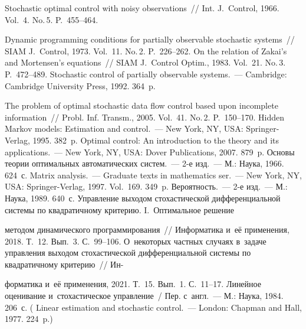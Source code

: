 \begin{multicols}{2}
{{\begin{thebibliography}{99}
 Stochastic optimal control with noisy observations~// Int. J.~Control, 
1966. Vol.~4. No.\,5. P.~455--464.

 Dynamic programming conditions for partially 
observable stochastic systems~// SIAM J.~Control, 1973. Vol.~11. No.\,2. P.~226--262.
 On the relation of Zakai's and Mortensen's equations~// SIAM 
J.~Control Optim., 1983. Vol.~21. No.\,3. P.~472--489.
 Stochastic control of partially observable systems.~--- Cambridge: 
Cambridge University Press, 1992. 364~p.

 The problem of optimal 
stochastic data flow control based upon incomplete information~// Probl. Inf. 
Transm., 2005. Vol.~41. No.\,2. P.~150--170.
 Hidden Markov models: Estimation and  
control.~--- New York, NY, USA: Springer-Verlag, 1995. 382~p.
 Optimal control: An introduction to the theory and its 
applications.~--- New York, NY, USA: Dover Publications, 2007. 879~p.
 Основы теории оптимальных автоматических сис\-тем.~--- 2-е изд.~--- М.: Наука, 1966. 624~с.
 Matrix analysis.~--- Graduate texts in mathematics ser.~--- 
New York, NY, USA: Springer-Verlag,  1997. Vol.~169. 349~p.
 Вероятность.~--- 2-е изд.~--- М.: Наука, 1989. 640~с.
 Управление выходом стохастической 
дифференциальной системы по квад\-ра\-тич\-но\-му критерию. I.~Оптимальное решение\linebreak\vspace*{-12pt}

\pagebreak

\noindent 
методом динамического программирования~// Информатика и~её применения, 2018. 
Т.~12. Вып.~3. С.~99--106.
 О~некоторых частных случаях в~задаче управления 
выходом стохастической дифференциальной системы по квадратичному критерию~// 
Ин-\linebreak\vspace*{-12pt}

\columnbreak

\noindent
форматика и~её применения, 2021. Т.~15. Вып.~1. С.~11--17.
 Линейное оценивание и~стохастическое управление~/ Пер. 
с~англ.~--- М.: Наука, 1984. 206~с. ( Linear estimation and stochastic 
control.~--- London: Chapman and Hall, 1977. 224~p.)

 \end{thebibliography}

}
}

\end{multicols}

